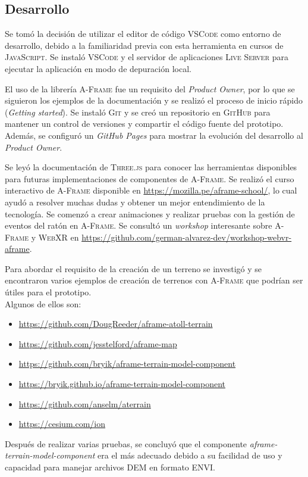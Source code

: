 \documentclass[a4paper, 11pt]{book}
\begin{document}
\subsection{Desarrollo}
Se tomó la decisión de utilizar el editor de código \textsc{VSCode} como entorno de desarrollo, debido a la familiaridad previa con esta herramienta en cursos de \textsc{JavaScript}. 
Se instaló \textsc{VSCode} y el servidor de aplicaciones \textsc{Live Server} para ejecutar la aplicación en modo de depuración local.

El uso de la librería \textsc{A-Frame} fue un requisito del \emph{Product Owner}, por lo que se siguieron los ejemplos de la documentación y se realizó el proceso de inicio rápido (\emph{Getting started}).
Se instaló \textsc{Git} y se creó un repositorio en \textsc{GitHub} para mantener un control de versiones y compartir el código fuente del prototipo. 
Además, se configuró un \emph{GitHub Pages} para mostrar la evolución del desarrollo al \emph{Product Owner}.

Se leyó la documentación de \textsc{Three.js} para conocer las herramientas disponibles para futuras implementaciones de componentes de \textsc{A-Frame}.
Se realizó el curso interactivo de \textsc{A-Frame} disponible en \url{https://mozilla.pe/aframe-school/}, lo cual ayudó a resolver muchas dudas y obtener un mejor entendimiento de la tecnología.
Se comenzó a crear animaciones y realizar pruebas con la gestión de eventos del ratón en \textsc{A-Frame}.
Se consultó un \emph{workshop} interesante sobre \textsc{A-Frame} y \textsc{WebXR} en \url{https://github.com/german-alvarez-dev/workshop-webvr-aframe}.

Para abordar el requisito de la creación de un terreno se investigó y se encontraron varios ejemplos de creación de terrenos con \textsc{A-Frame} que podrían ser útiles para el prototipo. \\
Algunos de ellos son:
\begin{itemize}
    \item \url{https://github.com/DougReeder/aframe-atoll-terrain}
    \item \url{https://github.com/jesstelford/aframe-map}
    \item \url{https://github.com/bryik/aframe-terrain-model-component}
    \item \url{https://bryik.github.io/aframe-terrain-model-component}
    \item \url{https://github.com/anselm/aterrain}
    \item \url{https://cesium.com/ion}
\end{itemize}
Después de realizar varias pruebas, se concluyó que el componente \emph{aframe-terrain-model-component} era el más adecuado debido a su facilidad de uso y capacidad para manejar archivos \textsc{DEM} en formato \textsc{ENVI}.
\end{document}
